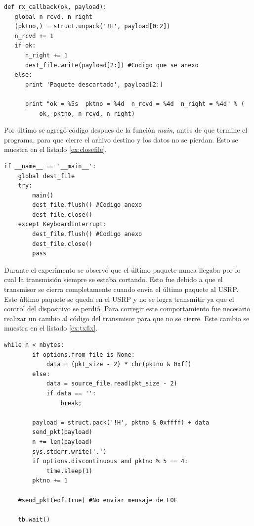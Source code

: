 \begin{lstlisting}[float, label=ex:rxcallback, caption={Funci\'on que recive los datos demodulados y
los escribe a un archivo.}, breaklines=true]
def rx_callback(ok, payload):
   global n_rcvd, n_right
   (pktno,) = struct.unpack('!H', payload[0:2])
   n_rcvd += 1
   if ok:
      n_right += 1
      dest_file.write(payload[2:]) #Codigo que se anexo
   else:
      print 'Paquete descartado', payload[2:]

      print "ok = %5s  pktno = %4d  n_rcvd = %4d  n_right = %4d" % (
          ok, pktno, n_rcvd, n_right)

\end{lstlisting}

Por \'ultimo se agreg\'o c\'odigo despues de la funci\'on \emph{main}, antes de que termine el programa, para que
cierre el arhivo destino y los datos no se pierdan. Esto se muestra en el listado
\ref{ex:closefile}.

\begin{lstlisting}[float, label=ex:closefile, caption={C\'odigo anexo al final del programa
\emph{benchmark} para cerrar el archivo destino.}, breaklines=true]
if __name__ == '__main__':
    global dest_file
    try:
        main()
        dest_file.flush() #Codigo anexo
        dest_file.close()
    except KeyboardInterrupt:
        dest_file.flush() #Codigo anexo
        dest_file.close()
        pass

\end{lstlisting}

Durante el experimento se observ\'o que el \'ultimo paquete nunca llegaba por lo cual la transmisi\'on
siempre se estaba cortando. Esto fue debido a que el transmisor se cierra completamente cuando envia
el \'ultimo paquete al USRP. Este \'ultimo paquete se queda en el USRP y no se logra transmitir ya que
el control del dispositivo se perdi\'o. Para corregir este comportamiento fue necesario realizar un
cambio al c\'odigo del transmisor para que no se cierre. Este cambio se muestra en el listado
\ref{ex:txfix}.

\begin{lstlisting}[float, label=ex:txfix, caption={Correcci\'on al c\'odigo TX para enviar el
\'ultimo paquete.}, breaklines=true]
    while n < nbytes:
        if options.from_file is None:
            data = (pkt_size - 2) * chr(pktno & 0xff) 
        else:
            data = source_file.read(pkt_size - 2)
            if data == '':
                break;

        payload = struct.pack('!H', pktno & 0xffff) + data
        send_pkt(payload)
        n += len(payload)
        sys.stderr.write('.')
        if options.discontinuous and pktno % 5 == 4:
            time.sleep(1)
        pktno += 1
        
    #send_pkt(eof=True) #No enviar mensaje de EOF

    tb.wait()                 
\end{lstlisting}

